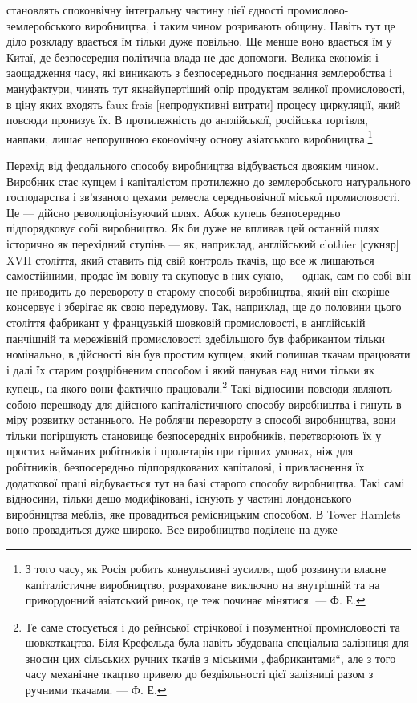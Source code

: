 \parcont{}  %
становлять споконвічну інтегральну частину цієї єдності промислово-землеробського
виробництва, і таким чином розривають
общину. Навіть тут це діло розкладу вдається їм тільки дуже
повільно. Ще менше воно вдається їм у Китаї, де безпосередня
політична влада не дає допомоги. Велика економія і заощадження
часу, які виникають з безпосереднього поєднання землеробства
і мануфактури, чинять тут якнайупертіший опір продуктам
великої промисловості, в ціну яких входять faux frais [непродуктивні
витрати] процесу циркуляції, який повсюди пронизує
їх. В протилежність до англійської, російська торгівля, навпаки,
лишає непорушною економічну основу азіатського виробництва.\footnote{
З того часу, як Росія робить конвульсивні зусилля, щоб розвинути
власне капіталістичне виробництво, розраховане виключно на внутрішній та
на прикордонний азіатський ринок, це теж починає мінятися. — Ф. Е.
}

Перехід від феодального способу виробництва відбувається
двояким чином. Виробник стає купцем і капіталістом протилежно
до землеробського натурального господарства і зв’язаного цехами
ремесла середньовічної міської промисловості. Це — дійсно
революціонізуючий шлях. Абож купець безпосередньо підпорядковує
собі виробництво. Як би дуже не впливав цей останній
шлях історично як перехідний ступінь — як, наприклад, англійський
clothier [сукняр] XVII століття, який ставить під свій контроль
ткачів, що все ж лишаються самостійними, продає їм вовну
та скуповує в них сукно, — однак, сам по собі він не приводить
до перевороту в старому способі виробництва, який він скоріше
консервує і зберігає як свою передумову. Так, наприклад, ще
до половини цього століття фабрикант у французькій шовковій
промисловості, в англійській панчішній та мережівній промисловості
здебільшого був фабрикантом тільки номінально, в дійсності
він був простим купцем, який полишав ткачам працювати
і далі їх старим роздрібненим способом і який панував над ними
тільки як купець, на якого вони фактично працювали.\footnote{
Те саме стосується і до рейнської стрічкової і позументної промисловості
та шовкоткацтва. Біля Крефельда була навіть збудована спеціальна залізниця
для зносин цих сільських ручних ткачів з міськими „фабрикантами“, але
з того часу механічне ткацтво привело до бездіяльності цієї залізниці разом
з ручними ткачами. — Ф. Е.
} Такі
відносини повсюди являють собою перешкоду для дійсного капіталістичного
способу виробництва і гинуть в міру розвитку останнього.
Не роблячи перевороту в способі виробництва, вони тільки
погіршують становище безпосередніх виробників, перетворюють
їх у простих найманих робітників і пролетарів при гірших умовах,
ніж для робітників, безпосередньо підпорядкованих капіталові,
і привласнення їх додаткової праці відбувається тут на базі старого
способу виробництва. Такі самі відносини, тільки дещо модифіковані,
існують у частині лондонського виробництва меблів,
яке провадиться ремісницьким способом. В Tower Hamlets воно
провадиться дуже широко. Все виробництво поділене на дуже
\parbreak{}  %
